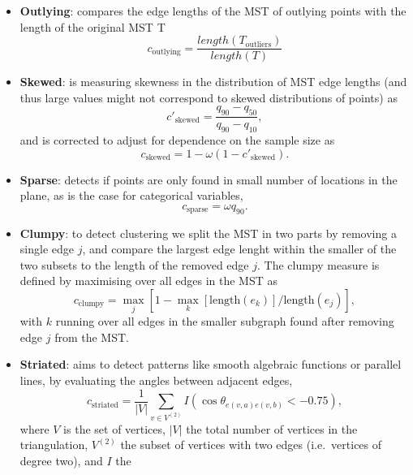 \begin{itemize}
\tightlist
\item
  \textbf{Outlying}: compares the edge lengths of the MST of outlying
  points with the length of the original MST T \begin{equation}
  c_{\mathrm{outlying}} = \frac{length(T_{\mathrm{outliers}})}{length(T)}
  \end{equation}
\item
  \textbf{Skewed}: is measuring skewness in the distribution of MST edge
  lengths (and thus large values might not correspond to skewed
  distributions of points) as \begin{equation}
  c'_{\mathrm{skewed}} = \frac{q_{90}-q_{50}}{q_{90}-q_{10}},
  \end{equation} and is corrected to adjust for dependence on the sample
  size as \begin{equation}
  c_{\mathrm{skewed}} = 1 - \omega (1 - c'_{\mathrm{skewed}}).
  \end{equation}
\item
  \textbf{Sparse}: detects if points are only found in small number of
  locations in the plane, as is the case for categorical variables,
  \begin{equation}
  c_{\mathrm{sparse}} = \omega q_{90}.
  \end{equation}
\item
  \textbf{Clumpy}: to detect clustering we split the MST in two parts by
  removing a single edge \(j\), and compare the largest edge lenght
  within the smaller of the two subsets to the length of the removed
  edge \(j\). The clumpy measure is defined by maximising over all edges
  in the MST as \begin{equation}
  c_{\mathrm{clumpy}} = \max_j [1 - \max_k[\mathrm{length}(e_k)] / \mathrm{length}(e_j) ],
  \end{equation} with \(k\) running over all edges in the smaller
  subgraph found after removing edge \(j\) from the MST.
\item
  \textbf{Striated}: aims to detect patterns like smooth algebraic
  functions or parallel lines, by evaluating the angles between adjacent
  edges, \begin{equation}
  c_{\mathrm{striated}} = \frac{1}{|V|} \sum_{v\in V^{(2)}} I(\cos\theta_{e(v,a)e(v,b)} < -0.75),
  \end{equation} where \(V\) is the set of vertices, \(|V|\) the total
  number of vertices in the triangulation, \(V^{(2)}\) the subset of
  vertices with two edges (i.e.~vertices of degree two), and \(I\) the

\end{itemize}
